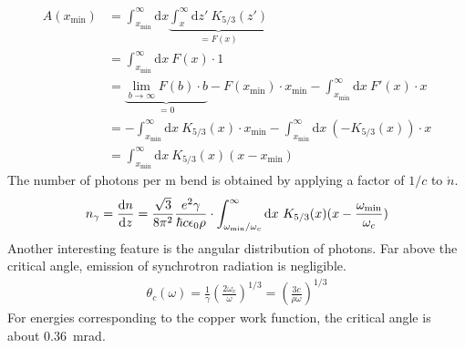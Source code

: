 \begin{align}
    A(x_\text{min}) &= \int_{x_\text{min}}^\infty \text{d}x  \underbrace{\int_x^\infty \text{d}z'\ K_{5/3}(z')}_{=F(x)}
    \\
    &=\int_{x_\text{min}}^\infty \text{d}x\ F(x) \cdot 1
    \\
    &= \underbrace{\lim_{b\rightarrow \infty}F(b) \cdot b}_{=0} - F(x_\text{min}) \cdot x_\text{min} - \int_{x_\text{min}}^\infty \text{d}x\ F'(x) \cdot x
    \\
    &= - \int_{x_\text{min}}^\infty \text{d}x\ K_{5/3}(x) \cdot x_\text{min} - \int_{x_\text{min}}^\infty \text{d}x\ (-K_{5/3}(x)) \cdot x
    \\
    &= \int_{x_\text{min}}^\infty \text{d}x\ K_{5/3}(x) (x-x_\text{min})
\end{align}
The number of photons per m bend is obtained by applying a factor of $1/c$ to $\dot{n}$.
\begin{align}
    n_\gamma = \frac{\text{d}n}{\text{d}z} = \frac{\sqrt{3}}{8\pi^2}\frac{e^2\gamma}{\hbar c \epsilon_0 \rho}
    \cdot
    \int_{\omega_\text{min}/\omega_c}^\infty \text{d}x\ K_{5/3}(x) (x-\frac{\omega_\text{min}}{\omega_c})
    \label{eq:ngamma}
\end{align}
Another interesting feature is the angular distribution of photons.
Far above the critical angle, emission of synchrotron radiation is negligible.
\begin{align}
    \theta_c(\omega)
    = \frac{1}{\gamma}\left( \frac{2\omega_c}{\omega} \right)^{1/3}
    = \left( \frac{3c}{\rho\omega} \right)^{1/3}
    \label{eq:crit_angle}
\end{align}
For energies corresponding to the copper work function, the critical angle is about 0.36~mrad.

